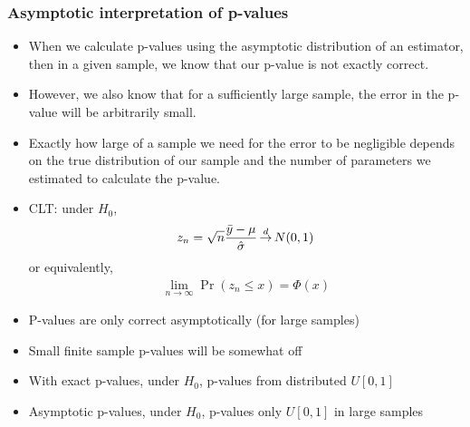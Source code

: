 \begin{frame}\frametitle{Asymptotic interpretation of p-values}
  \begin{itemize}
 \item  When we calculate p-values using the asymptotic distribution of an
estimator, then in a given sample, we know that our p-value is not
exactly correct. 
\item However, we also know that for a sufficiently large
sample, the error in the p-value will be arbitrarily small. 
\item Exactly
how large of a sample we need for the error to be negligible depends
on the true distribution of our sample and the number of parameters we
estimated to calculate the p-value. 
  \item CLT: under $H_0$,
    \begin{align*}
      z_n = \sqrt{n} \frac{\bar{y} - \mu}{\hat{\sigma}} \indist
      N(0,1)  
    \end{align*}
    or equivalently,
    \begin{align*}
      \lim_{n \to \infty} \Pr(z_n \leq x) = \Phi(x)
    \end{align*}
  \item P-values are only correct asymptotically (for large samples)
  \item Small finite sample p-values will be somewhat off
  \item With exact p-values, under $H_0$, p-values from distributed
    $U[0,1]$
  \item Asymptotic p-values, under $H_0$, p-values only $U[0,1]$ in
    large samples
  \end{itemize}
\end{frame}




